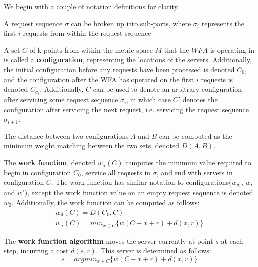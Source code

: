 
We begin with a couple of notation definitions for clarity.

\begin{definition}
    A request sequence $\sigma$ can be broken up into sub-parts, where $\sigma_i$ represents the first $i$ requests from within the request sequence
\end{definition}

\begin{definition}
    A set $C$ of k-points from within the metric space $M$ that the $WFA$ is operating in is called a \textbf{configuration}, representing the locations of the servers. Additionally, the initial configuration before any requests have been processed is denoted $C_0$, and the configuration after the WFA has operated on the first $i$ requests is denoted $C_{\sigma_i}$. Additionally, $C$ can be used to denote an arbitrary configuration after servicing some request sequence $\sigma_i$, in which case $C'$ denotes the configuration after servicing the next request, i.e. servicing the request sequence $\sigma_{i+1}$.
\end{definition}

\begin{definition}
    The distance between two configurations $A$ and $B$ can be computed as the minimum weight matching between the two sets, denoted $D(A, B)$.
\end{definition}

\begin{definition}
    The \textbf{work function}, denoted $w_\sigma(C)$ computes the minimum value required to begin in configuration $C_0$, service all requests in $\sigma$, and end with servers in configuration $C$. The work function has similar notation to configurations($w_{\sigma_i}$, $w$, and $w'$), except the work function value on an empty request sequence is denoted $w_\emptyset$. Additionally, the work function can be computed as follows:
    \begin{equation*}
        \begin{gathered}
            w_\emptyset(C) = D(C_0, C) \\
            w_\sigma(C) = min_{x \in C} \{ w(C - x + r) + d(x, r)\}
        \end{gathered}
    \end{equation*}
\end{definition}

\begin{definition}
    The \textbf{work function algorithm} moves the server currently at point $s$ at each step, incurring a cost $d(s,r)$. This server is determined as follows:
    \begin{equation*}
        s = argmin_{x \in C} \{ w(C-x+r) + d(x,r)\}
    \end{equation*}
\end{definition}